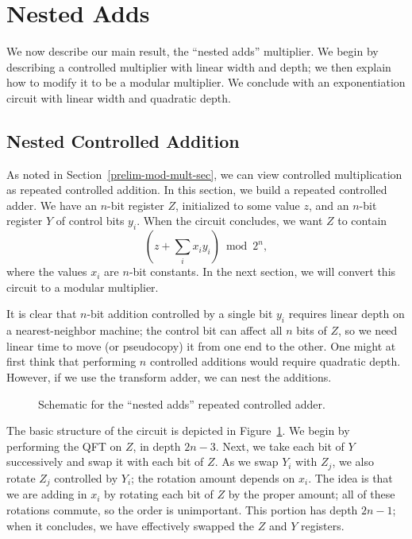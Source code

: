 \documentclass{article} %
\newcommand{\caps}[1]{{\sc #1}}
\newcommand{\QFT}{\caps{QFT}\xspace}
\begin{document}
\section{Nested Adds}
\label{main-sec}

We now describe our main result, the ``nested adds'' multiplier.
We begin by describing a controlled multiplier with linear width
and depth; we then explain how to modify it to be a modular multiplier.
We conclude with an exponentiation circuit with linear width and
quadratic depth.

\subsection{Nested Controlled Addition}
\label{main-add-sec}

As noted in Section~\ref{prelim-mod-mult-sec}, we can view
controlled multiplication as repeated controlled addition.
In this section, we build a repeated controlled adder.
We have an $n$-bit
register $Z$, initialized to some value $z$, and an $n$-bit
register $Y$ of control bits $y_i$.  When the circuit concludes,
we want $Z$ to contain $$\left(z + \sum_i x_i y_i\right) \bmod 2^n,$$ where
the values $x_i$ are $n$-bit constants.  In the next section, we
will convert this circuit to a modular multiplier.

It is clear that $n$-bit addition controlled by a single bit $y_i$
requires linear depth on a nearest-neighbor machine; the control
bit can affect all $n$ bits of $Z$, so we need linear time to
move (or pseudocopy) it from one end to the other.  One might at
first think that performing $n$ controlled additions would require
quadratic depth.  However, if we use the transform adder, we can
nest the additions.

\begin{figure}[h!]
\begin{center}

\end{center}
\caption{Schematic for the ``nested adds'' repeated controlled adder.}
\label{nested-fig}
\end{figure}

The basic structure of the circuit is depicted in Figure~\ref{nested-fig}.
We begin by performing the {\QFT} on $Z$, in depth $2n-3$.
Next, we take each bit of $Y$ successively and swap it with each
bit of $Z$.  As we swap $Y_i$ with $Z_j$, we also rotate $Z_j$
controlled by $Y_i$; the rotation amount depends on $x_i$.  The idea
is that we are adding in $x_i$ by rotating each bit of $Z$ by the
proper amount; all of these rotations commute, so the order is
unimportant.  This portion has depth $2n - 1$; when it concludes,
we have effectively swapped the $Z$ and $Y$ registers.
\end{document}
